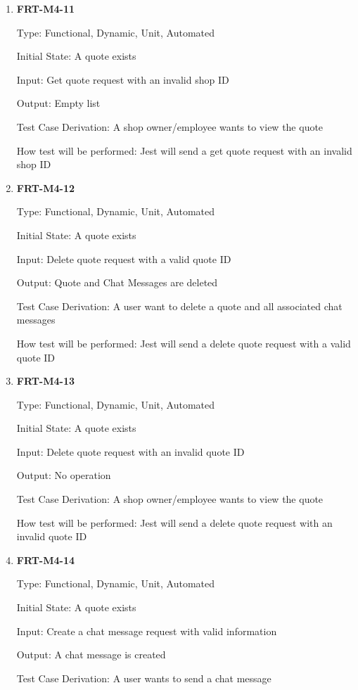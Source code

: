 \documentclass[12pt, titlepage]{article}
\begin{document}
\begin{enumerate}
	\item \textbf{FRT-M4-11}

	      Type: Functional, Dynamic, Unit, Automated

	      Initial State: A quote exists

	      Input: Get quote request with an invalid shop ID

	      Output: Empty list

	      Test Case Derivation: A shop owner/employee wants to view the quote

	      How test will be performed: Jest will send a get quote request with an invalid shop ID

	\item \textbf{FRT-M4-12}

	      Type: Functional, Dynamic, Unit, Automated

	      Initial State: A quote exists

	      Input: Delete quote request with a valid quote ID

	      Output: Quote and Chat Messages are deleted

	      Test Case Derivation: A user want to delete a quote and all associated chat messages

	      How test will be performed: Jest will send a delete quote request with a valid quote ID

	\item \textbf{FRT-M4-13}

	      Type: Functional, Dynamic, Unit, Automated

	      Initial State: A quote exists

	      Input: Delete quote request with an invalid quote ID

	      Output: No operation

	      Test Case Derivation: A shop owner/employee wants to view the quote

	      How test will be performed: Jest will send a delete quote request with an invalid quote ID

	\item \textbf{FRT-M4-14}

	      Type: Functional, Dynamic, Unit, Automated

	      Initial State: A quote exists

	      Input: Create a chat message request with valid information

	      Output: A chat message is created

	      Test Case Derivation: A user wants to send a chat message


\end{enumerate}
\end{document}
